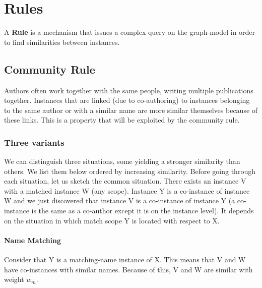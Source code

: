 \section{Rules}




\begin{mydef}
\label{def:rule}
A \textbf{Rule} is a mechanism that issues a complex query on the graph-model in order to find similarities between instances.
\end{mydef}

\subsection{Community Rule}

Authors often work together with the same people, writing multiple publications together. Instances that are linked (due to co-authoring) to instances belonging to the same author or with a similar name are more similar themselves because of these links. This is a property that will be exploited by the community rule. 

\subsubsection{Three variants}

We can distinguish three situations, some yielding a stronger similarity than others. We list them below ordered by increasing similarity. Before going through each situation, let us sketch the common situation. There exists an instance V with a matched instance W (any scope). Instance Y is a co-instance of instance W and we just discovered that instance V is a co-instance of instance Y (a co-instance is the same as a co-author except it is on the instance level). It depends on the situation in which match scope Y is located with respect to X.

\paragraph{Name Matching} Consider that Y is a matching-name instance of X. This means that V and W have co-instances with similar names. Because of this, V and W are similar with weight $w_m$.

